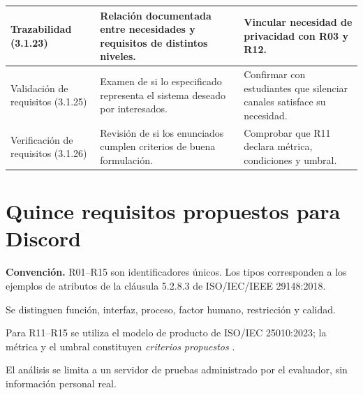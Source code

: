 \documentclass[12pt,a4paper]{article}
\begin{document}
\begin{longtable}{
    |p{2.7cm}
    |p{5.5cm}
    |p{6.1cm}|
}
Trazabilidad (3.1.23) &
Relación documentada entre necesidades y requisitos de distintos niveles. &
Vincular necesidad de privacidad con R03 y R12.\\
\hline

Validación de requisitos (3.1.25) &
Examen de si lo especificado representa el sistema deseado por interesados. &
Confirmar con estudiantes que silenciar canales satisface su necesidad.\\
\hline

Verificación de requisitos (3.1.26) &
Revisión de si los enunciados cumplen criterios de buena formulación. &
Comprobar que R11 declara métrica, condiciones y umbral.\\
\hline

\end{longtable}
\endgroup


\section{Quince requisitos propuestos para Discord}

\textbf{Convención.}
R01--R15 son identificadores únicos. Los tipos corresponden a los ejemplos de atributos de la cláusula 5.2.8.3 de ISO/IEC/IEEE 29148:2018.

Se distinguen función, interfaz, proceso, factor humano, restricción y calidad.

Para R11--R15 se utiliza el modelo de producto de ISO/IEC 25010:2023; la métrica y el umbral constituyen \emph{criterios propuestos} \cite{iso29148,iso25010}.

El análisis se limita a un servidor de pruebas administrado por el evaluador, sin información personal real.

\begingroup
\footnotesize
\setlength{\tabcolsep}{3pt}
\renewcommand{\arraystretch}{1.16}
\end{document}
